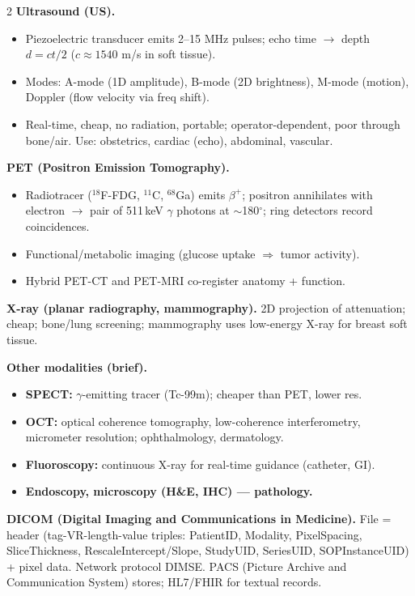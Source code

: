 \begin{paracol}{2}
\textbf{Ultrasound (US).}
\begin{itemize}[leftmargin=*,nosep]
  \item Piezoelectric transducer emits 2--15 MHz pulses; echo time $\to$ depth $d=ct/2$ ($c\!\approx\!1540$ m/s in soft tissue).
  \item Modes: A-mode (1D amplitude), B-mode (2D brightness), M-mode (motion), Doppler (flow velocity via freq shift).
  \item Real-time, cheap, no radiation, portable; operator-dependent, poor through bone/air. Use: obstetrics, cardiac (echo), abdominal, vascular.
\end{itemize}

\textbf{PET (Positron Emission Tomography).}
\begin{itemize}[leftmargin=*,nosep]
  \item Radiotracer ($^{18}$F-FDG, $^{11}$C, $^{68}$Ga) emits $\beta^+$; positron annihilates with electron $\to$ pair of 511\,keV $\gamma$ photons at $\sim$180$^\circ$; ring detectors record coincidences.
  \item Functional/metabolic imaging (glucose uptake $\Rightarrow$ tumor activity).
  \item Hybrid PET-CT and PET-MRI co-register anatomy + function.
\end{itemize}

\textbf{X-ray (planar radiography, mammography).} 2D projection of attenuation; cheap; bone/lung screening; mammography uses low-energy X-ray for breast soft tissue.

\textbf{Other modalities (brief).}
\begin{itemize}[leftmargin=*,nosep]
  \item \textbf{SPECT:} $\gamma$-emitting tracer (Tc-99m); cheaper than PET, lower res.
  \item \textbf{OCT:} optical coherence tomography, low-coherence interferometry, micrometer resolution; ophthalmology, dermatology.
  \item \textbf{Fluoroscopy:} continuous X-ray for real-time guidance (catheter, GI).
  \item \textbf{Endoscopy, microscopy (H\&E, IHC) — pathology.}
\end{itemize}

\textbf{DICOM (Digital Imaging and Communications in Medicine).}
File = header (tag-VR-length-value triples: PatientID, Modality, PixelSpacing, SliceThickness, RescaleIntercept/Slope, StudyUID, SeriesUID, SOPInstanceUID) + pixel data. Network protocol DIMSE. PACS (Picture Archive and Communication System) stores; HL7/FHIR for textual records.


\end{paracol}
